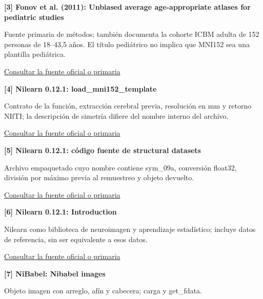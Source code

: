 \hypertarget{refR3}{}\textbf{[3] Fonov et al. (2011): Unbiased average age-appropriate atlases for pediatric studies}\par

Fuente primaria de métodos; también documenta la cohorte ICBM adulta de 152 personas de 18–43,5 años. El título pediátrico no implica que MNI152 sea una plantilla pediátrica.


\href{https://pmc.ncbi.nlm.nih.gov/articles/PMC2962759/}{Consultar la fuente oficial o primaria}\par\medskip

\hypertarget{refR4}{}\textbf{[4] Nilearn 0.12.1: load\_mni152\_template}\par

Contrato de la función, extracción cerebral previa, resolución en mm y retorno NIfTI; la descripción de simetría difiere del nombre interno del archivo.


\href{https://nilearn.github.io/0.12.1/modules/generated/nilearn.datasets.load_mni152_template.html}{Consultar la fuente oficial o primaria}\par\medskip

\hypertarget{refR5}{}\textbf{[5] Nilearn 0.12.1: código fuente de structural datasets}\par

Archivo empaquetado cuyo nombre contiene sym\_09a, conversión float32, división por máximo previa al remuestreo y objeto devuelto.


\href{https://github.com/nilearn/nilearn/blob/0.12.1/nilearn/datasets/struct.py}{Consultar la fuente oficial o primaria}\par\medskip

\hypertarget{refR6}{}\textbf{[6] Nilearn 0.12.1: Introduction}\par

Nilearn como biblioteca de neuroimagen y aprendizaje estadístico; incluye datos de referencia, sin ser equivalente a esos datos.


\href{https://nilearn.github.io/0.12.1/introduction.html}{Consultar la fuente oficial o primaria}\par\medskip

\hypertarget{refR7}{}\textbf{[7] NiBabel: Nibabel images}\par

Objeto imagen con arreglo, afín y cabecera; carga y get\_fdata.


